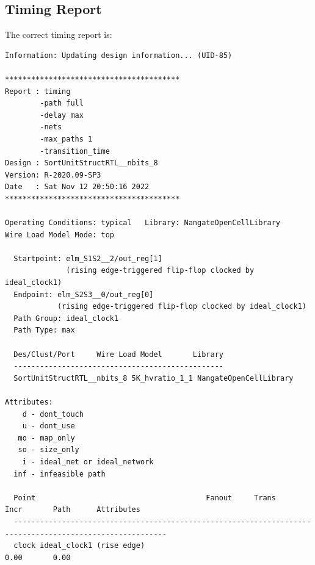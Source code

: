 \documentclass[a4paper,12pt,twoside]{article}
\begin{document}
\subsection{Timing Report}
The correct timing report is:
\begin{verbatim}
Information: Updating design information... (UID-85)

****************************************
Report : timing
        -path full
        -delay max
        -nets
        -max_paths 1
        -transition_time
Design : SortUnitStructRTL__nbits_8
Version: R-2020.09-SP3
Date   : Sat Nov 12 20:50:16 2022
****************************************

Operating Conditions: typical   Library: NangateOpenCellLibrary
Wire Load Model Mode: top

  Startpoint: elm_S1S2__2/out_reg[1]
              (rising edge-triggered flip-flop clocked by ideal_clock1)
  Endpoint: elm_S2S3__0/out_reg[0]
            (rising edge-triggered flip-flop clocked by ideal_clock1)
  Path Group: ideal_clock1
  Path Type: max

  Des/Clust/Port     Wire Load Model       Library
  ------------------------------------------------
  SortUnitStructRTL__nbits_8 5K_hvratio_1_1 NangateOpenCellLibrary

Attributes:
    d - dont_touch
    u - dont_use
   mo - map_only
   so - size_only
    i - ideal_net or ideal_network
  inf - infeasible path

  Point                                       Fanout     Trans      Incr       Path      Attributes
  ---------------------------------------------------------------------------------------------------------
  clock ideal_clock1 (rise edge)                                    0.00       0.00


\end{verbatim}
\end{document}

